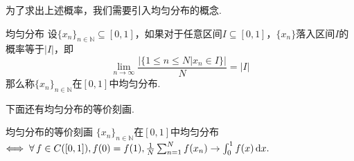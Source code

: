为了求出上述概率，我们需要引入均匀分布的概念.\par

\begin{definition}{均匀分布}
    设$\{x_n\}_{n\in\mathbb{N}} \subseteq [0,1]$，如果对于任意区间$I \subseteq [0,1]$，$\{x_n\}$落入区间$I$的概率等于$|I|$，即
    \[\lim_{n\to\infty}{\frac{\Big|\big\{1\leqslant n \leqslant N|x_n \in I\big\}\Big|}{N}} = |I|\]
    那么称$\{x_n\}_{n\in\mathbb{N}}$在$[0,1]$中均匀分布.
\end{definition}

下面还有均匀分布的等价刻画.
\begin{proposition}{均匀分布的等价刻画}
    $\{x_n\}_{n\in\mathbb{N}}$在$[0,1]$中均匀分布$\Longleftrightarrow\; \forall\, f\in C([0,1]), f(0)=f(1), \frac{1}{N}\sum_{n=1}^N{f(x_n)}\to \int_{0}^{1}{f(x)}\mathop{}\!\mathrm{d} x.$
\end{proposition}
